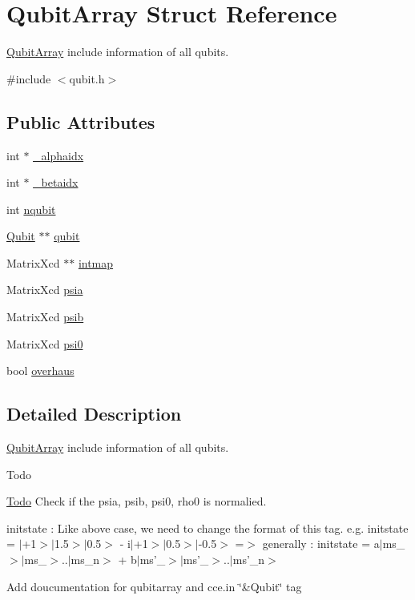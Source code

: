 \hypertarget{structQubitArray}{\section{Qubit\-Array Struct Reference}
\label{structQubitArray}
}


\hyperlink{structQubitArray}{Qubit\-Array} include information of all qubits.  




{\ttfamily \#include $<$qubit.\-h$>$}

\subsection*{Public Attributes}
\begin{DoxyCompactItemize}
\item 
int $\ast$ \hyperlink{structQubitArray_a0a5c3875737d2a3bc14399109e89c82d}{\-\_\-alphaidx}
\item 
int $\ast$ \hyperlink{structQubitArray_a93fa20887ef373b3710d0734e9f1b7a4}{\-\_\-betaidx}
\item 
int \hyperlink{structQubitArray_ac87a8cdf149336447fe601f59c7ff371}{nqubit}
\item 
\hyperlink{structQubit}{Qubit} $\ast$$\ast$ \hyperlink{structQubitArray_ae87046f60e524d2aed1f6605c746d86e}{qubit}
\item 
Matrix\-Xcd $\ast$$\ast$ \hyperlink{structQubitArray_a1d74d3f22fe851f267c72b8cda416dd0}{intmap}
\item 
Matrix\-Xcd \hyperlink{structQubitArray_a168f33429921f2605e8c3ab850d3e6d9}{psia}
\item 
Matrix\-Xcd \hyperlink{structQubitArray_ad88cb397f3656eb7ac316e966d5e9172}{psib}
\item 
Matrix\-Xcd \hyperlink{structQubitArray_a17543dd30e2e5ef672ff5f751119beea}{psi0}
\item 
bool \hyperlink{structQubitArray_ab1cb38fcd5640338fad8c2abc868b53e}{overhaus}
\end{DoxyCompactItemize}


\subsection{Detailed Description}
\hyperlink{structQubitArray}{Qubit\-Array} include information of all qubits. 

\begin{DoxyRefDesc}{Todo}
\item[\hyperlink{todo__todo000013}{Todo}]Check if the psia, psib, psi0, rho0 is normalied. 

initstate \-: Like above case, we need to change the format of this tag. e.\-g. initstate = $|$+1$>$$|$1.5$>$$|$0.5$>$ -\/ i$|$+1$>$$|$0.5$>$$|$-\/0.5$>$ =$>$ generally \-: initstate = a$|$ms\-\_$>$$|$ms\-\_$>$..$|$ms\-\_\-n$>$ + b$|$ms'\-\_$>$$|$ms'\-\_$>$..$|$ms'\-\_\-n$>$ 

Add doucumentation for qubitarray and cce.\-in \char`\"{}\&\-Qubit\char`\"{} tag \end{DoxyRefDesc}


